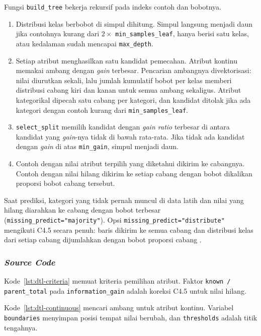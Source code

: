 Fungsi \texttt{build\_tree} bekerja rekursif pada indeks contoh dan bobotnya.
\begin{enumerate}
	\item Distribusi kelas berbobot di simpul dihitung. Simpul langsung menjadi daun jika contohnya
	kurang dari $2 \times$ \texttt{min\_samples\_leaf}, hanya berisi satu kelas, atau kedalaman sudah
	mencapai \texttt{max\_depth}.
	\item Setiap atribut menghasilkan satu kandidat pemecahan. Atribut kontinu memakai ambang dengan
	\textit{gain} terbesar. Pencarian ambangnya divektorisasi: nilai diurutkan sekali, lalu jumlah
	kumulatif bobot per kelas memberi distribusi cabang kiri dan kanan untuk semua ambang sekaligus.
	Atribut kategorikal dipecah satu cabang per kategori, dan kandidat ditolak jika ada kategori
	dengan contoh kurang dari \texttt{min\_samples\_leaf}.
	\item \texttt{select\_split} memilih kandidat dengan \textit{gain ratio} terbesar di antara
	kandidat yang \textit{gain}-nya tidak di bawah rata-rata. Jika tidak ada kandidat dengan
	\textit{gain} di atas \texttt{min\_gain}, simpul menjadi daun.
	\item Contoh dengan nilai atribut terpilih yang diketahui dikirim ke cabangnya. Contoh dengan nilai
	hilang dikirim ke setiap cabang dengan bobot dikalikan proporsi bobot cabang tersebut.
\end{enumerate}
Saat prediksi, kategori yang tidak pernah muncul di data latih dan nilai yang hilang diarahkan ke
cabang dengan bobot terbesar (\texttt{missing\_predict="majority"}). Opsi
\texttt{missing\_predict="distribute"} mengikuti C4.5 secara penuh: baris dikirim ke semua cabang dan
distribusi kelas dari setiap cabang dijumlahkan dengan bobot proporsi cabang \cite{quinlan1993c45}.

\subsubsection{\textit{Source Code}}

Kode~\ref{lst:dtl-criteria} memuat kriteria pemilihan atribut. Faktor \texttt{known /
parent\_total} pada \texttt{information\_gain} adalah koreksi C4.5 untuk nilai hilang.


Kode~\ref{lst:dtl-continuous} mencari ambang untuk atribut kontinu. Variabel \texttt{boundaries}
menyimpan posisi tempat nilai berubah, dan \texttt{thresholds} adalah titik tengahnya.

